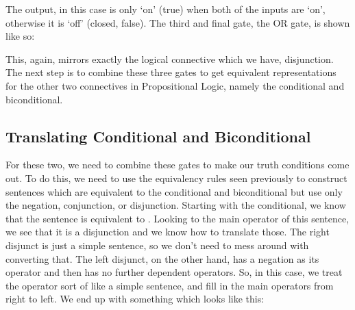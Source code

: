 The output, in this case is only `on' (true) when both of the inputs are `on', otherwise it is `off' (closed, false). The third and final gate, the OR gate, is shown like so:

    

This, again, mirrors exactly the logical connective which we have, disjunction. The next step is to combine these three gates to get equivalent representations for the other two connectives in Propositional Logic, namely the conditional and biconditional. 

\subsection{Translating Conditional and Biconditional}

For these two, we need to combine these gates to make our truth conditions come out. To do this, we need to use the equivalency rules seen previously to construct sentences which are equivalent to the conditional and biconditional but use only the negation, conjunction, or disjunction. Starting with the conditional, we know that the sentence \eif{} is equivalent to \enot{}\eor{}. Looking to the main operator of this sentence, we see that it is a disjunction and we know how to translate those. The right disjunct is just a simple sentence, so we don't need to mess around with converting that. The left disjunct, on the other hand, has a negation as its operator and then has no further dependent operators. So, in this case, we treat the operator sort of like a simple sentence, and fill in the main operators from right to left. We end up with something which looks like this:

 
